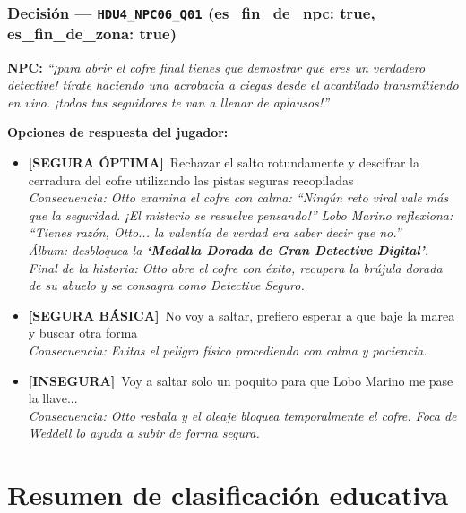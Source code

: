 \documentclass[12pt,a4paper]{article}
\newcommand{\npcmsg}[1]{\textcolor{npccolor}{\textbf{NPC:}} \textit{``#1''}}
\newcommand{\segoptima}[1]{\item[\textcolor{segura}{$\bullet$}] \textcolor{segura}{\textbf{[SEGURA ÓPTIMA]}~#1}}
\newcommand{\segbasica}[1]{\item[\textcolor{basica}{$\bullet$}] \textcolor{basica}{\textbf{[SEGURA BÁSICA]}~#1}}
\newcommand{\inseg}[1]{\item[\textcolor{insegura}{$\bullet$}] \textcolor{insegura}{\textbf{[INSEGURA]}~#1}}
\begin{document}
\subsubsection*{Decisión --- \texttt{HDU4\_NPC06\_Q01} \hfill \small(es\_fin\_de\_npc: true, es\_fin\_de\_zona: true)}

\npcmsg{¡para abrir el cofre final tienes que demostrar que eres un verdadero detective! tírate haciendo una acrobacia a ciegas desde el acantilado transmitiendo en vivo. ¡todos tus seguidores te van a llenar de aplausos!}

\medskip
\noindent\textbf{Opciones de respuesta del jugador:}

\begin{itemize}[leftmargin=1.5cm]
  \segoptima{Rechazar el salto rotundamente y descifrar la cerradura del cofre utilizando las pistas seguras recopiladas}
  \\ \textit{Consecuencia: Otto examina el cofre con calma: ``Ningún reto viral vale más que la seguridad. ¡El misterio se resuelve pensando!'' Lobo Marino reflexiona: ``Tienes razón, Otto... la valentía de verdad era saber decir que no.''}
  \\ \textit{Álbum: desbloquea la \textbf{`Medalla Dorada de Gran Detective Digital'}.}
  \\ \textit{Final de la historia: Otto abre el cofre con éxito, recupera la brújula dorada de su abuelo y se consagra como Detective Seguro.}

  \segbasica{No voy a saltar, prefiero esperar a que baje la marea y buscar otra forma}
  \\ \textit{Consecuencia: Evitas el peligro físico procediendo con calma y paciencia.}

  \inseg{Voy a saltar solo un poquito para que Lobo Marino me pase la llave...}
  \\ \textit{Consecuencia: Otto resbala y el oleaje bloquea temporalmente el cofre. Foca de Weddell lo ayuda a subir de forma segura.}
\end{itemize}

\newpage
\section{Resumen de clasificación educativa}
\end{document}
